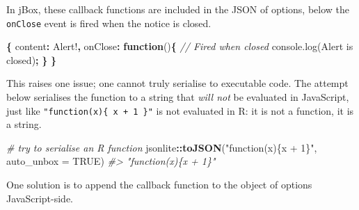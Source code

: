 \documentclass[
]{krantz}
\makeatletter
\newenvironment{Shaded}{\begin{snugshade}}{\end{snugshade}}
\newcommand{\AttributeTok}[1]{\textcolor[rgb]{0.61,0.61,0.61}{#1}}
\newcommand{\CommentTok}[1]{\textcolor[rgb]{0.37,0.37,0.37}{\textit{#1}}}
\newcommand{\DataTypeTok}[1]{\textcolor[rgb]{0.27,0.27,0.27}{#1}}
\newcommand{\KeywordTok}[1]{\textcolor[rgb]{0.27,0.27,0.27}{\textbf{#1}}}
\newcommand{\NormalTok}[1]{#1}
\newcommand{\OperatorTok}[1]{\textcolor[rgb]{0.43,0.43,0.43}{\textbf{#1}}}
\newcommand{\OtherTok}[1]{\textcolor[rgb]{0.37,0.37,0.37}{#1}}
\newcommand{\StringTok}[1]{\textcolor[rgb]{0.5,0.5,0.5}{#1}}
\newcommand{\VariableTok}[1]{\textcolor[rgb]{0,0,0}{#1}}
\newenvironment{kframe}{%
\medskip{}
\setlength{\fboxsep}{.8em}
 \def\at@end@of@kframe{}%
 \ifinner\ifhmode%
  \def\at@end@of@kframe{\end{minipage}}%
  \begin{minipage}{\columnwidth}%
 \fi\fi%
 \def\FrameCommand##1{\hskip\@totalleftmargin \hskip-\fboxsep
 \colorbox{shadecolor}{##1}\hskip-\fboxsep
     \hskip-\linewidth \hskip-\@totalleftmargin \hskip\columnwidth}%
 \MakeFramed {\advance\hsize-\width
   \@totalleftmargin\z@ \linewidth\hsize
   \@setminipage}}%
 {\par\unskip\endMakeFramed%
 \at@end@of@kframe}
\renewenvironment{Shaded}{\begin{kframe}}{\end{kframe}}
\makeatother
\begin{document}
In jBox, these callback functions are included in the JSON of options, below the \texttt{onClose} event is fired when the notice is closed.

\begin{Shaded}
\begin{Highlighting}[]
\OperatorTok{\{}
  \DataTypeTok{content}\OperatorTok{:} \StringTok{\textquotesingle{}Alert!\textquotesingle{}}\OperatorTok{,}
  \DataTypeTok{onClose}\OperatorTok{:} \KeywordTok{function}\NormalTok{()}\OperatorTok{\{}
    \CommentTok{// Fired when closed }
    \VariableTok{console}\NormalTok{.}\AttributeTok{log}\NormalTok{(}\StringTok{\textquotesingle{}Alert is closed\textquotesingle{}}\NormalTok{)}\OperatorTok{;}
  \OperatorTok{\}}
\OperatorTok{\}}
\end{Highlighting}
\end{Shaded}

This raises one issue; one cannot truly serialise to executable code. The attempt below serialises the function to a string that \emph{will not} be evaluated in JavaScript, just like \texttt{"function(x)\{\ x\ +\ 1\ \}"} is not evaluated in R: it is not a function, it is a string.

\begin{Shaded}
\begin{Highlighting}[]
\CommentTok{\# try to serialise an R function}
\NormalTok{jsonlite}\OperatorTok{::}\KeywordTok{toJSON}\NormalTok{(}\StringTok{"function(x)\{x + 1\}"}\NormalTok{, }\DataTypeTok{auto\_unbox =} \OtherTok{TRUE}\NormalTok{)}
\CommentTok{\#> "function(x)\{x + 1\}"}
\end{Highlighting}
\end{Shaded}

One solution is to append the callback function to the object of options JavaScript-side.

\begin{Shaded}
\end{Shaded}
\end{document}
